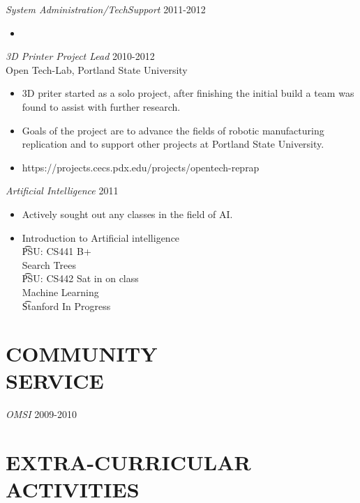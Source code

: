 \documentclass[margin]{res}
\begin{document}
\begin{resume}
				{\sl System Administration/TechSupport} \hfill 2011-2012
				\begin{itemize} \itemsep -2pt
					\item	
				\end{itemize}
				
				{\sl 3D Printer Project Lead} \hfill 2010-2012 \\
                Open Tech-Lab, Portland State University
				\begin{itemize}  \itemsep -2pt %
					\item  	3D priter started as a solo project, after
					 		finishing the initial build a team was found to
							assist with further research.
					\item  	Goals of the project are to advance the fields of 
					 		robotic manufacturing replication and to support
							other projects at Portland State University.
					\item   https://projects.cecs.pdx.edu/projects/opentech-reprap
                \end{itemize}
 
 				{\sl Artificial Intelligence} \hfill 2011
				\begin{itemize} \itemsep -2pt
					\item	Actively sought out any classes in the field of 
							AI.
					\item	Introduction to Artificial intelligence \\
							\t PSU: CS441 B+ \\
							Search Trees \\
							\t PSU: CS442 Sat in on class \\
							Machine Learning \\
							\t Stanford In Progress\\
				\end{itemize}
					 
\section{COMMUNITY \\ SERVICE}  
				{\sl OMSI} \hfil 2009-2010



\section{EXTRA-CURRICULAR \\ ACTIVITIES}             
				 

\end{resume}
\end{document}
